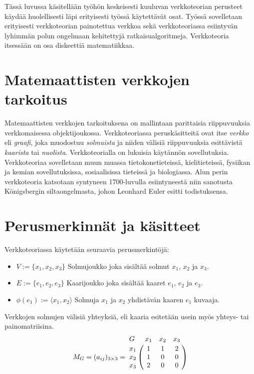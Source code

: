 Tässä luvussa käsitellään työhön keskeisesti kuuluvan verkkoteorian perusteet käydää huolellisesti läpi erityisesti työssä käytettävät osat.
Työssä sovelletaan erityisesti verkkoteorian painotettua verkkoa sekä verkkoteoriassa esiintyvän lyhimmän polun ongelmaan kehitettyjä ratkaisualgoritmeja.
Verkkoteoria itsessään on osa diskeettiä matematiikkaa.

\section{Matemaattisten verkkojen tarkoitus}

Matemaattisten verkkojen tarkoituksena on mallintaan parittaisia riippuvuuksia verkkomaisessa objektijoukossa.
Verkkoteoriassa peruskäsitteitä ovat itse \textit{verkko} eli \textit{graafi}, joka muodostuu \textit{solmuista} ja niiden välisiä riippuvuuksia esittävistä \textit{kaarista} tai \textit{nuolista}.
Verkkoteorialla on lukuisia käytännön sovellutuksia. Verkkoteoriaa sovelletaan muun muassa tietokonetieteissä, kielitieteissä, fysiikan ja kemian sovellutuksissa, sosiaalisissa tieteissä ja biologiassa.
Alun perin verkkoteoria katsotaan syntyneen 1700-luvulla esiintyneestä niin sanotusta Königsbergin siltaongelmasta, johon Leonhard Euler esitti todistuksensa.

\section{Perusmerkinnät ja käsitteet}

Verkkoteoriassa käytetään seuraavia perusmerkintöjä:
\begin{itemize}
  \item \(V := \{x_1, x_2, x_3\}\) Solmujoukko joka sisältää solmut \(x_1\), \(x_2\) ja \(x_3\).
  \item \(E := \{e_1, e_2, e_3\}\) Kaarijoukko joka sisältää kaaret \(e_1\), \(e_2\) ja \(e_3\).
  \item \(\phi(e_1) := \langle x_1, x_2 \rangle\) Solmuja \(x_1\) ja \(x_2\) yhdistävän kaaren \(e_1\) kuvaaja.
\end{itemize}

Verkkojen solmujen välisiä yhteyksiä, eli kaaria esitetään usein myös yhteys- tai painomatriisina.
\[
  M_G = (a_{ij})_{3\times3} =
  \bordermatrix{
    G & x_1 & x_2 & x_3 \cr
    x_1 & 1 & 1 & 2 \cr
    x_2 & 1 & 0 & 0 \cr
    x_3 & 2 & 0 & 0 \cr
  }
\]

